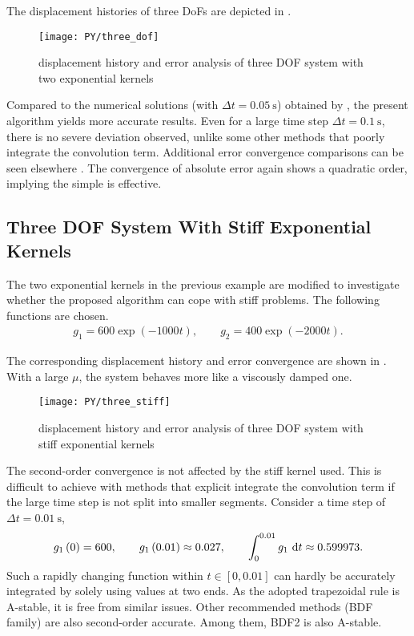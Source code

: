 The displacement histories of three DoFs are depicted in .
\begin{figure}[H]
\centering
\texttt{[image: PY/three\_dof]}
\caption{displacement history and error analysis of three DOF system with two exponential kernels}\label{fig:three}
\end{figure}

Compared to the numerical solutions (with $\Delta{}t=\SI{0.05}{\second}$) obtained by \citet{Cortes2009}, the present algorithm yields more accurate results. Even for a large time step $\Delta{}t=\SI{0.1}{\second}$, there is no severe deviation observed, unlike some other methods \citep{Puthanpurayil2014,Liu2014} that poorly integrate the convolution term. Additional error convergence comparisons can be seen elsewhere \citep{Liu2023}. The convergence of absolute error again shows a quadratic order, implying the simple  is effective.
\subsection{Three DOF System With Stiff Exponential Kernels}
The two exponential kernels in the previous example are modified to investigate whether the proposed algorithm can cope with stiff problems. The following functions are chosen.
\begin{gather}
g_1=600\exp\left(-1000t\right),\qquad
g_2=400\exp\left(-2000t\right).
\end{gather}

The corresponding displacement history and error convergence are shown in . With a large $\mu$, the system behaves more like a viscously damped one.
\begin{figure}[H]
\centering
\texttt{[image: PY/three\_stiff]}
\caption{displacement history and error analysis of three DOF system with stiff exponential kernels}\label{fig:three_stiff}
\end{figure}
The second-order convergence is not affected by the stiff kernel used. This is difficult to achieve with methods that explicit integrate the convolution term if the large time step is not split into smaller segments. Consider a time step of $\Delta{}t=\SI{0.01}{\second}$,
\begin{gather}
g_1\left(0\right)=600,\qquad
g_1\left(0.01\right)\approx\num{0.027},\qquad\int_{0}^{0.01}g_1~\mathrm{d}t\approx0.599973.
\end{gather}
Such a rapidly changing function within $t\in[0,0.01]$ can hardly be accurately integrated by solely using values at two ends.
As the adopted trapezoidal rule is A-stable, it is free from similar issues. Other recommended methods (BDF family) are also second-order accurate. Among them, BDF2 is also A-stable.
